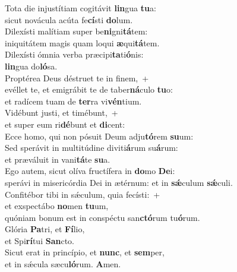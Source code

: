 \evenverse Tota die injustítiam cogitávit \textbf{lin}gua \textbf{tu}a:~\*\\
\evenverse sicut novácula acúta fe\textbf{cí}sti \textbf{do}lum.\\
\oddverse Dilexísti malítiam super be\textbf{ni}gni\textbf{tá}tem:~\*\\
\oddverse iniquitátem magis quam loqui \textbf{æ}qui\textbf{tá}tem.\\
\evenverse Dilexísti ómnia verba præcipi\textbf{ta}ti\textbf{ó}nis:~\*\\
\evenverse \textbf{lin}gua do\textbf{ló}sa.\\
\oddverse Proptérea Deus déstruet te in finem,~+\\
\oddverse  evéllet te, et emigrábit te de taber\textbf{ná}culo \textbf{tu}o:~\*\\
\oddverse et radícem tuam de \textbf{ter}ra vi\textbf{vén}tium.\\
\evenverse Vidébunt justi, et timébunt,~+\\
\evenverse  et super eum ri\textbf{dé}bunt et \textbf{di}cent:~\*\\
\evenverse Ecce homo, qui non pósuit Deum adju\textbf{tó}rem \textbf{su}um:\\
\oddverse Sed sperávit in multitúdine diviti\textbf{á}rum su\textbf{á}rum:~\*\\
\oddverse et præváluit in vani\textbf{tá}te \textbf{su}a.\\
\evenverse Ego autem, sicut olíva fructífera in \textbf{do}mo \textbf{De}i:~\*\\
\evenverse sperávi in misericórdia Dei in ætérnum: et in \textbf{sǽ}culum \textbf{sǽ}culi.\\
\oddverse Confitébor tibi in sǽculum, quia fecísti:~+\\
\oddverse  et exspectábo \textbf{no}men \textbf{tu}um,~\*\\
\oddverse quóniam bonum est in conspéctu san\textbf{ctó}rum tu\textbf{ó}rum.\\
\evenverse Glória \textbf{Pa}tri, et \textbf{Fí}lio,~\*\\
\evenverse et Spi\textbf{rí}tui \textbf{San}cto.\\
\oddverse Sicut erat in princípio, et \textbf{nunc}, et \textbf{sem}per,~\*\\
\oddverse et in sǽcula sæcu\textbf{ló}rum. \textbf{A}men.\\
